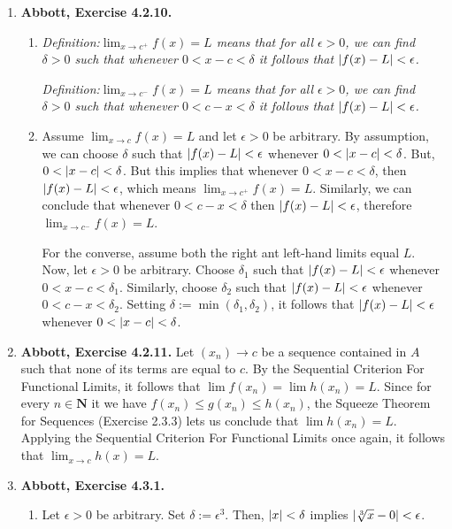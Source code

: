 \documentclass{article}
\DeclarePairedDelimiter\abs{\lvert}{\rvert}
\newcommand{\N}{\mathbf{N}}
\newcommand{\exc}[2][Abbott]{\item \textbf{#1, Exercise #2.}}
\newcommand{\lep}[1][L]{#1et $\epsilon > 0$ be arbitrary}
\begin{document}
\begin{enumerate}
    \exc{4.2.10}
    \begin{enumerate}
        \item \em{Definition:}\em \space $\lim_{x \to c^+} f(x) = L$ means that for all $\epsilon > 0$, we can find $\delta > 0$ such that whenever  $0 < x-c < \delta$ it follows that $\abs{f(x) - L} < \epsilon$.
        
        \noindent \em{Definition:}\em \space $\lim_{x \to c^-} f(x) = L$ means that for all $\epsilon > 0$, we can find $\delta > 0$ such that whenever  $0 < c-x < \delta$ it follows that $\abs{f(x) - L} < \epsilon$.
        
        \item Assume $\lim_{x \to c} f(x) = L$ and \lep[l]. By assumption, we can choose $\delta$ such that $\abs{f(x)-L} < \epsilon$ whenever $0 < \abs{x-c} < \delta$. But, $0 < \abs{x-c}<\delta$. But this implies that whenever $0 < x-c < \delta$, then $\abs{f(x)-L} < \epsilon$, which means $\lim_{x \to c^+} f(x) = L$. Similarly, we can conclude that whenever $0 < c-x < \delta$ then $\abs{f(x)-L} < \epsilon$, therefore $\lim_{x \to c^-} f(x) = L$.
        
        For the converse, assume both the right ant left-hand limits equal $L$. Now, let $\epsilon > 0$ be arbitrary. Choose $\delta_1$ such that $\abs{f(x)-L} < \epsilon$ whenever $0 < x-c < \delta_1$. Similarly, choose $\delta_2$ such that $\abs{f(x)-L} < \epsilon$ whenever $0 < c-x < \delta_2$. Setting $\delta := \min(\delta_1, \delta_2)$, it follows that $\abs{f(x)-L} < \epsilon$ whenever $0 < \abs{x-c} < \delta$.
    \end{enumerate}
    
    \exc{4.2.11}
    Let $(x_n) \to c$ be a sequence contained in $A$ such that none of its terms are equal to $c$. By the Sequential Criterion For Functional Limits, it follows that $\lim f(x_n) = \lim h(x_n) = L$. Since for every $n \in \N$ it we have $f(x_n) \leq g(x_n) \leq h(x_n)$, the Squeeze Theorem for Sequences (Exercise 2.3.3) lets us conclude that $\lim h(x_n) = L$. Applying the Sequential Criterion For Functional Limits once again, it follows that $\lim_{x \to c} h(x) = L$.
    
    \exc{4.3.1}
    \begin{enumerate}
        \item \lep. Set $\delta := \epsilon^3$. Then, $\abs{x} < \delta$ implies 
        $\abs{\sqrt[3]{x}-0} < \epsilon$.
        

\end{enumerate}
\end{enumerate}
\end{document}
